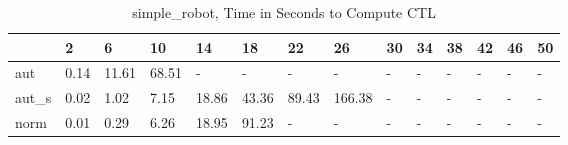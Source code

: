 \begin{table}
\caption{simple_robot, Time in Seconds to Compute CTL}
\label{simple_robot_CTL_time}
\begin{tabular}{llllllllllllll}
\toprule
 & 2 & 6 & 10 & 14 & 18 & 22 & 26 & 30 & 34 & 38 & 42 & 46 & 50 \\
\midrule
aut & 0.14 & 11.61 & 68.51 & - & - & - & - & - & - & - & - & - & - \\
aut_s & 0.02 & 1.02 & 7.15 & 18.86 & 43.36 & 89.43 & 166.38 & - & - & - & - & - & - \\
norm & 0.01 & 0.29 & 6.26 & 18.95 & 91.23 & - & - & - & - & - & - & - & - \\
\bottomrule
\end{tabular}
\end{table}

